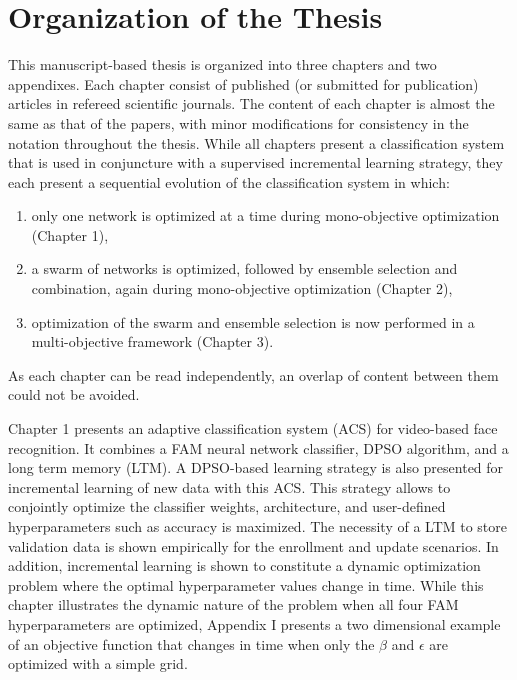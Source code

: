 \section{Organization of the Thesis}

This manuscript-based thesis is organized into three chapters and two appendixes.
Each chapter consist of published (or submitted for publication) articles in refereed scientific journals.
The content of each chapter is almost the same as that of the papers, with minor modifications for consistency in the notation throughout the thesis. 
While all chapters present a classification system that is used in conjuncture with a supervised incremental learning strategy, they each present a sequential evolution of the classification system in which: 
\begin{enumerate}
	\item only one network is optimized at a time during mono-objective optimization (Chapter 1),
	\item a swarm of networks is optimized, followed by ensemble selection and combination, again during mono-objective optimization (Chapter 2),
	\item optimization of the swarm and ensemble selection is now performed in a multi-objective framework (Chapter 3).
\end{enumerate}
As each chapter can be read independently, an overlap of content between them could not be avoided.


Chapter 1 presents an adaptive classification system (ACS) for video-based face recognition.
It combines a FAM neural network classifier, DPSO algorithm, and a long term memory (LTM).
A DPSO-based learning strategy is also presented for incremental learning of new data with this ACS.
This strategy allows to conjointly optimize the classifier weights, architecture, and user-defined hyperparameters such as accuracy is maximized.
The necessity of a LTM to store validation data is shown empirically for the enrollment and update scenarios.
In addition, incremental learning is shown to constitute a dynamic optimization problem where the optimal hyperparameter values change in time.
While this chapter illustrates the dynamic nature of the problem when all four FAM hyperparameters are optimized, Appendix I presents a two dimensional example of an objective function that changes in time when only the $\beta$ and $\epsilon$ are optimized with a simple grid.

